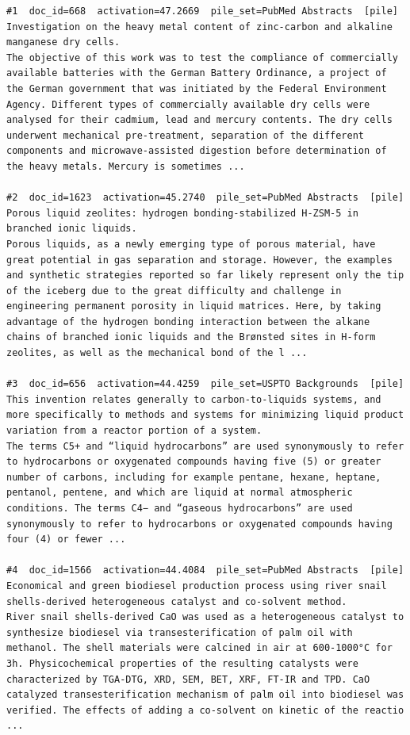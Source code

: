 \begin{verbatim}
#1  doc_id=668  activation=47.2669  pile_set=PubMed Abstracts  [pile]
Investigation on the heavy metal content of zinc-carbon and alkaline manganese dry cells.
The objective of this work was to test the compliance of commercially available batteries with the German Battery Ordinance, a project of the German government that was initiated by the Federal Environment Agency. Different types of commercially available dry cells were analysed for their cadmium, lead and mercury contents. The dry cells underwent mechanical pre-treatment, separation of the different components and microwave-assisted digestion before determination of the heavy metals. Mercury is sometimes ...

#2  doc_id=1623  activation=45.2740  pile_set=PubMed Abstracts  [pile]
Porous liquid zeolites: hydrogen bonding-stabilized H-ZSM-5 in branched ionic liquids.
Porous liquids, as a newly emerging type of porous material, have great potential in gas separation and storage. However, the examples and synthetic strategies reported so far likely represent only the tip of the iceberg due to the great difficulty and challenge in engineering permanent porosity in liquid matrices. Here, by taking advantage of the hydrogen bonding interaction between the alkane chains of branched ionic liquids and the Brønsted sites in H-form zeolites, as well as the mechanical bond of the l ...

#3  doc_id=656  activation=44.4259  pile_set=USPTO Backgrounds  [pile]
This invention relates generally to carbon-to-liquids systems, and more specifically to methods and systems for minimizing liquid product variation from a reactor portion of a system.
The terms C5+ and “liquid hydrocarbons” are used synonymously to refer to hydrocarbons or oxygenated compounds having five (5) or greater number of carbons, including for example pentane, hexane, heptane, pentanol, pentene, and which are liquid at normal atmospheric conditions. The terms C4− and “gaseous hydrocarbons” are used synonymously to refer to hydrocarbons or oxygenated compounds having four (4) or fewer ...

#4  doc_id=1566  activation=44.4084  pile_set=PubMed Abstracts  [pile]
Economical and green biodiesel production process using river snail shells-derived heterogeneous catalyst and co-solvent method.
River snail shells-derived CaO was used as a heterogeneous catalyst to synthesize biodiesel via transesterification of palm oil with methanol. The shell materials were calcined in air at 600-1000°C for 3h. Physicochemical properties of the resulting catalysts were characterized by TGA-DTG, XRD, SEM, BET, XRF, FT-IR and TPD. CaO catalyzed transesterification mechanism of palm oil into biodiesel was verified. The effects of adding a co-solvent on kinetic of the reactio ...


\end{verbatim}
